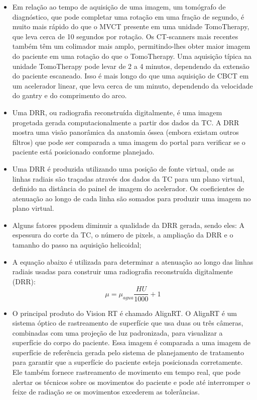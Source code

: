 \documentclass[11pt,a4paper]{article}
\newcounter{exemplo}
\begin{document}
\begin{exemplo}[12. IGRT ]
\begin{itemize}
        \item Em relação ao tempo de aquisição de uma imagem, um tomógrafo de diagnóstico, que pode completar uma rotação em uma fração de segundo, é muito mais rápido do que o MVCT presente em uma unidade TomoTherapy, que leva cerca de 10 segundos por rotação. Os CT-scanners mais recentes também têm um colimador mais amplo, permitindo-lhes obter maior imagem do paciente em uma rotação do que o TomoTherapy. Uma aquisição típica na unidade TomoTherapy pode levar de 2 a 4 minutos, dependendo da extensão do paciente escaneado. Isso é mais longo do que uma aquisição de CBCT em um acelerador linear, que leva cerca de um minuto, dependendo da velocidade do gantry e do comprimento do arco.
        
        \item Uma DRR, ou radiografia reconstruída digitalmente, é uma imagem progetada gerada computacionalmente a partir dos dados da TC. A DRR mostra uma visão panorâmica da anatomia óssea (embora existam outros filtros) que pode ser comparada a uma imagem do portal para verificar se o paciente está posicionado conforme planejado.
        
        \item Uma DRR é produzida utilizando uma posição de fonte virtual, onde as linhas radiais são traçadas através dos dados da TC para um plano virtual, definido na distância do painel de imagem do acelerador. Os coeficientes de atenuação ao longo de cada linha são somados para produzir uma imagem no plano virtual.
        
        \item Alguns fatores ppodem diminuir a qualidade da DRR gerada, sendo eles: A espessura do corte da TC, o número de pixels, a ampliação da DRR e o tamanho do passo na aquisição helicoidal;
        
        \item A equação abaixo é utilizada para determinar a atenuação ao longo das linhas radiais usadas para construir uma radiografia reconstruída digitalmente (DRR): 
            $$\mu = \mu_{agua}\frac{HU}{1000} + 1$$
        
        \item O principal produto do Vision RT é chamado AlignRT. O AlignRT é um sistema óptico de rastreamento de superfície que usa duas ou três câmeras, combinadas com uma projeção de luz padronizada, para visualizar a superfície do corpo do paciente. Essa imagem é comparada a uma imagem de superfície de referência gerada pelo sistema de planejamento de tratamento para garantir que a superfície do paciente esteja posicionada corretamente. Ele também fornece rastreamento de movimento em tempo real, que pode alertar os técnicos sobre os movimentos do paciente e pode até interromper o feixe de radiação se os movimentos excederem as tolerâncias.
        

\end{itemize}
\end{exemplo}
\end{document}
